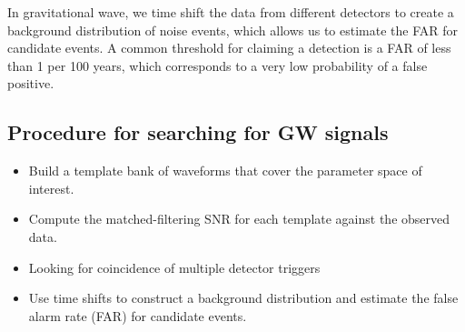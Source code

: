 \documentclass[12pt, a4paper]{article}
\theoremstyle{plain} %
\theoremstyle{definition} %
\begin{document}
In gravitational wave, we time shift the data from different detectors to create a background distribution of noise events, which allows us to estimate the FAR for candidate events. A common threshold for claiming a detection is a FAR of less than 1 per 100 years, which corresponds to a very low probability of a false positive.

\subsection*{Procedure for searching for GW signals}
\begin{itemize}
    \item Build a template bank of waveforms that cover the parameter space of interest.
    \item Compute the matched-filtering SNR for each template against the observed data.
    \item Looking for coincidence of multiple detector triggers
    \item Use time shifts to construct a background distribution and estimate the false alarm rate (FAR) for candidate events.
\end{itemize}
\end{document}
